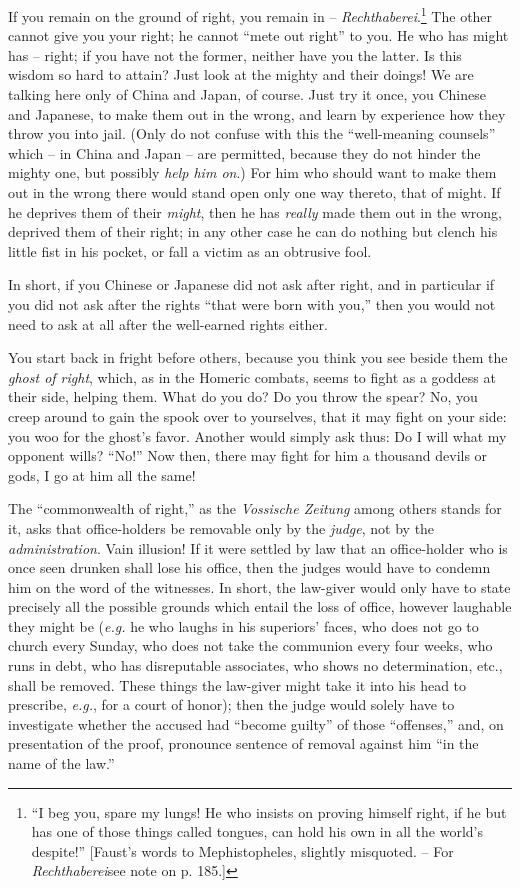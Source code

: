 \documentclass[12pt,a4paper]{book}
\begin{document}
If you remain on the ground of right, you remain in -- 
\textit{Rechthaberei}.\footnote{``I beg you, spare my lungs! He who insists 
on proving himself right, if he but has one of those things called tongues, 
can hold his own in all the world's despite!'' [Faust's words to 
Mephistopheles, slightly misquoted. -- For \textit{Rechthaberei}see note on p. 
185.]} The other cannot give you your right; he cannot ``mete out right'' to 
you. He who has might has -- right; if you have not the former, neither have 
you the latter. Is this wisdom so hard to attain? Just look at the mighty and 
their doings! We are talking here only of China and Japan, of course. Just try 
it once, you Chinese and Japanese, to make them out in the wrong, and learn by 
experience how they throw you into jail. (Only do not confuse with this the 
``well-meaning counsels'' which -- in China and Japan -- are permitted, 
because they do not hinder the mighty one, but possibly \textit{help him on}.) 
For him who should want to make them out in the wrong there would stand open 
only one way thereto, that of might. If he deprives them of their 
\textit{might}, then he has \textit{really} made them out in the wrong, 
deprived them of their right; in any other case he can do nothing but clench 
his little fist in his pocket, or fall a victim as an obtrusive fool.

In short, if you Chinese or Japanese did not ask after right, and in 
particular if you did not ask after the rights ``that were born with you,'' 
then you would not need to ask at all after the well-earned rights either.

You start back in fright before others, because you think you see beside them 
the \textit{ghost of right}, which, as in the Homeric combats, seems to fight 
as a goddess at their side, helping them. What do you do? Do you throw the 
spear? No, you creep around to gain the spook over to yourselves, that it may 
fight on your side: you woo for the ghost's favor. Another would simply ask 
thus: Do I will what my opponent wills? ``No!'' Now then, there may fight 
for him a thousand devils or gods, I go at him all the same!

The ``commonwealth of right,'' as the \textit{Vossische Zeitung} among 
others stands for it, asks that office-holders be removable only by the 
\textit{judge}, not by the \textit{administration}. Vain illusion! If it were 
settled by law that an office-holder who is once seen drunken shall lose his 
office, then the judges would have to condemn him on the word of the 
witnesses. In short, the law-giver would only have to state precisely all the 
possible grounds which entail the loss of office, however laughable they might 
be (\textit{e.g.} he who laughs in his superiors' faces, who does not go to 
church every Sunday, who does not take the communion every four weeks, who 
runs in debt, who has disreputable associates, who shows no determination, 
etc., shall be removed. These things the law-giver might take it into his head 
to prescribe, \textit{e.g.}, for a court of honor); then the judge would 
solely have to investigate whether the accused had ``become guilty'' of 
those ``offenses,'' and, on presentation of the proof, pronounce sentence of 
removal against him ``in the name of the law.''
\end{document}

